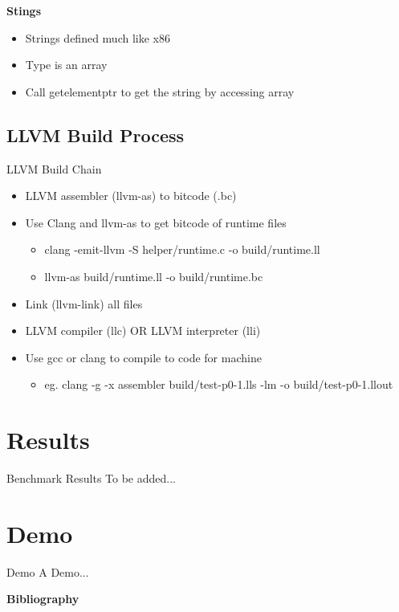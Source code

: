 \documentclass{beamer}
\begin{document}
\begin{frame}[shrink]{\bf Stings}
  \begin{itemize}
  \item<1->Strings defined much like x86
  \item<2->Type is an array
  \item<3->Call getelementptr to get the string by accessing array
  \end{itemize}
  \pause
  
\end{frame}

\subsection{LLVM Build Process}

\begin{frame}{LLVM Build Chain}
\begin{itemize}
  \item<1->LLVM assembler (llvm-as) to bitcode (.bc)
  \item<2->Use Clang and llvm-as to get bitcode of runtime files
  \begin{itemize}
    \item<2->clang -emit-llvm -S helper/runtime.c -o build/runtime.ll
    \item<2->llvm-as  build/runtime.ll -o build/runtime.bc
  \end{itemize}
  \item<3->Link (llvm-link) all files
  \item<4->LLVM compiler (llc) OR LLVM interpreter (lli)
  \item<5->Use gcc or clang to compile to code for machine 
  \begin{itemize}
    \item<5->eg. clang -g -x assembler build/test-p0-1.lls -lm -o build/test-p0-1.llout
  \end{itemize}
  \end{itemize}
\end{frame}

\section{Results}

\begin{frame}{Benchmark Results}
  To be added...
\end{frame}

\section{Demo}

\begin{frame}{Demo}
  A Demo...
\end{frame}

\begin{frame}[t,allowframebreaks]{\bf Bibliography}
  \nocite{*}
  \printbibliography
\end{frame}
\end{document}
